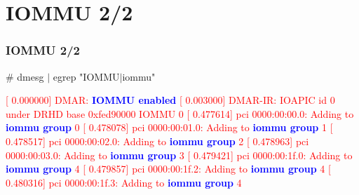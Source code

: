 \documentclass[aspectratio=169]{beamer}
\begin{document}

\section{IOMMU 2/2}
\begin{frame}
\frametitle{IOMMU 2/2}
\begin{block}{}
{\Large \# dmesg $|$ egrep "IOMMU$|$iommu"} \newline

\textcolor{red}{[    0.000000] DMAR: \textbf{\textcolor{blue}{IOMMU enabled}}} \newline
\textcolor{red}{[    0.003000] DMAR-IR: IOAPIC id 0 under DRHD base  0xfed90000 IOMMU 0} \newline
\textcolor{red}{[    0.477614] pci 0000:00:00.0: Adding to \textbf{\textcolor{blue}{iommu group}} 0} \newline
\textcolor{red}{[    0.478078] pci 0000:00:01.0: Adding to \textbf{\textcolor{blue}{iommu group}} 1} \newline
\textcolor{red}{[    0.478517] pci 0000:00:02.0: Adding to \textbf{\textcolor{blue}{iommu group}} 2} \newline
\textcolor{red}{[    0.478963] pci 0000:00:03.0: Adding to \textbf{\textcolor{blue}{iommu group}} 3} \newline
\textcolor{red}{[    0.479421] pci 0000:00:1f.0: Adding to \textbf{\textcolor{blue}{iommu group}} 4} \newline
\textcolor{red}{[    0.479857] pci 0000:00:1f.2: Adding to \textbf{\textcolor{blue}{iommu group}} 4} \newline
\textcolor{red}{[    0.480316] pci 0000:00:1f.3: Adding to \textbf{\textcolor{blue}{iommu group}} 4}
\end{block}
\end{frame}

\end{document}
